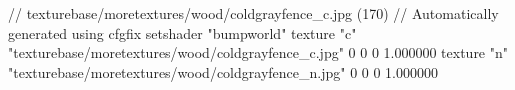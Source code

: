// texturebase/moretextures/wood/coldgrayfence_c.jpg (170)
// Automatically generated using cfgfix
setshader "bumpworld"
texture "c" "texturebase/moretextures/wood/coldgrayfence_c.jpg" 0 0 0 1.000000
texture "n" "texturebase/moretextures/wood/coldgrayfence_n.jpg" 0 0 0 1.000000
